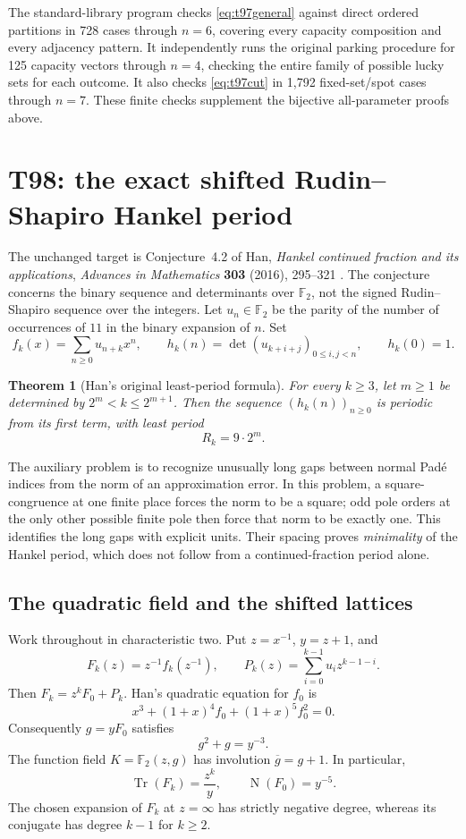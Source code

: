 \documentclass[11pt,a4paper]{article}
\newtheorem{theorem}{Theorem}[section]
\theoremstyle{definition}
\theoremstyle{remark}
\begin{document}
The standard-library program  checks
\eqref{eq:t97general} against direct ordered partitions in 728 cases
through $n=6$, covering every capacity composition and every adjacency
pattern. It independently runs the original parking procedure for 125
capacity vectors through $n=4$, checking the entire family of possible
lucky sets for each outcome. It also checks \eqref{eq:t97cut} in 1,792
fixed-set/spot cases through $n=7$. These finite checks supplement the
bijective all-parameter proofs above.

\clearpage
\section{T98: the exact shifted Rudin--Shapiro Hankel period}
\label{sec:t98}

The unchanged target is Conjecture~4.2 of Han,
\emph{Hankel continued fraction and its applications},
\emph{Advances in Mathematics} \textbf{303} (2016), 295--321
\cite{t98han2016}.
The conjecture concerns the binary sequence and determinants over
$\mathbb F_2$, not the signed Rudin--Shapiro sequence over the integers.
Let $u_n\in\mathbb F_2$ be the parity of the number of occurrences of
$11$ in the binary expansion of $n$. Set
\[
 f_k(x)=\sum_{n\ge0}u_{n+k}x^n,
 \qquad h_k(n)=\det(u_{k+i+j})_{0\le i,j<n},\qquad h_k(0)=1.
\]

\begin{theorem}[Han's original least-period formula]
For every $k\ge3$, let $m\ge1$ be determined by
$2^m<k\le2^{m+1}$. Then the sequence $(h_k(n))_{n\ge0}$ is
periodic from its first term, with least period
\[
                         R_k=9\cdot2^m.
\]
\end{theorem}

The auxiliary problem is to recognize unusually long gaps between normal
Pad\'e indices from the norm of an approximation error. In this problem,
a square-congruence at one finite place forces the norm to be a square;
odd pole orders at the only other possible finite pole then force that
norm to be exactly one. This identifies the long gaps with explicit
units. Their spacing proves \emph{minimality} of the Hankel period,
which does not follow from a continued-fraction period alone.

\subsection{The quadratic field and the shifted lattices}

Work throughout in characteristic two. Put $z=x^{-1}$, $y=z+1$, and
\[
 F_k(z)=z^{-1}f_k(z^{-1}),\qquad
 P_k(z)=\sum_{i=0}^{k-1}u_i z^{k-1-i}.
\]
Then $F_k=z^kF_0+P_k$. Han's quadratic equation for $f_0$ is
\[
 x^3+(1+x)^4f_0+(1+x)^5f_0^2=0.
\]
Consequently $g=yF_0$ satisfies
\[
                         g^2+g=y^{-3}.
\]
The function field $K=\mathbb F_2(z,g)$ has involution
$\overline g=g+1$. In particular,
\begin{equation}\label{eq:t98trace}
 \operatorname{Tr}(F_k)=\frac{z^k}{y},\qquad
 \operatorname{N}(F_0)=y^{-5}.
\end{equation}
The chosen expansion of $F_k$ at $z=\infty$ has strictly negative
degree, whereas its conjugate has degree $k-1$ for $k\ge2$.
\end{document}
